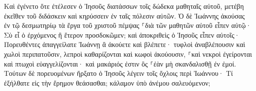 \documentclass{openreader}
\begin{document}
Καὶ ἐγένετο ὅτε ἐτέλεσεν ὁ Ἰησοῦς διατάσσων τοῖς δώδεκα μαθηταῖς αὐτοῦ, μετέβη ἐκεῖθεν τοῦ διδάσκειν καὶ κηρύσσειν ἐν ταῖς πόλεσιν αὐτῶν. 
Ὁ δὲ Ἰωάννης ἀκούσας ἐν τῷ δεσμωτηρίῳ τὰ ἔργα τοῦ χριστοῦ πέμψας ⸀διὰ τῶν μαθητῶν αὐτοῦ 
εἶπεν αὐτῷ· Σὺ εἶ ὁ ἐρχόμενος ἢ ἕτερον προσδοκῶμεν; 
καὶ ἀποκριθεὶς ὁ Ἰησοῦς εἶπεν αὐτοῖς· Πορευθέντες ἀπαγγείλατε Ἰωάννῃ ἃ ἀκούετε καὶ βλέπετε· 
τυφλοὶ ἀναβλέπουσιν καὶ χωλοὶ περιπατοῦσιν, λεπροὶ καθαρίζονται καὶ κωφοὶ ἀκούουσιν, ⸀καὶ νεκροὶ ἐγείρονται καὶ πτωχοὶ εὐαγγελίζονται· 
καὶ μακάριός ἐστιν ὃς ⸀ἐὰν μὴ σκανδαλισθῇ ἐν ἐμοί. 
Τούτων δὲ πορευομένων ἤρξατο ὁ Ἰησοῦς λέγειν τοῖς ὄχλοις περὶ Ἰωάννου· Τί ἐξήλθατε εἰς τὴν ἔρημον θεάσασθαι; κάλαμον ὑπὸ ἀνέμου σαλευόμενον; 
\end{document}
